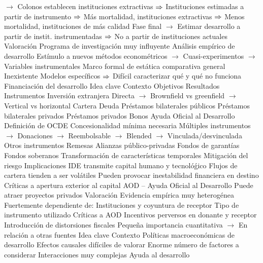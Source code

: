 \documentclass{nuevotema}
\begin{document}
\begin{esquemal}
				\4[] $\to$ Colonos establecen instituciones extractivas
				\4[] $\Rightarrow$ Instituciones estimadas a partir de instrumento
				\4[] $\Rightarrow$ Más mortalidad, instituciones extractivas
				\4[] $\Rightarrow$ Menos mortalidad, instituciones de más calidad
				\4[] Fase final
				\4[] $\to$ Estimar desarrollo a partir de instit. instrumentadas
				\4[] $\Rightarrow$ No a partir de instituciones actuales
			\3 Valoración
				\4 Programa de investigación muy influyente
				\4[] Análisis empírico de desarrollo
				\4[] Estímulo a nuevos métodos econométricos
				\4[] $\to$ Cuasi-experimentos
				\4[] $\to$ Variables instrumentales
				\4 Marco formal de estática comparativa general
				\4[] Inexistente
				\4[] Modelos específicos
				\4[] $\Rightarrow$ Difícil caracterizar qué y qué no funciona
		\2 Financiación del desarrollo
			\3 Idea clave
				\4 Contexto
				\4 Objetivos
				\4 Resultados
			\3 Instrumentos
				\4 Inversión extranjera
				\4[] Directa
				\4[] $\to$ Brownfield vs greenfield
				\4[] $\to$ Vertical vs horizontal
				\4[] Cartera
				\4 Deuda
				\4[] Préstamos bilaterales públicos
				\4[] Préstamos bilaterales privados
				\4[] Préstamos privados
				\4[] Bonos
				\4 Ayuda Oficial al Desarrollo
				\4[] Definición de OCDE
				\4[] Concesionalidad mínima necesaria
				\4[] Múltiples instrumentos
				\4[] $\to$ Donaciones
				\4[] $\to$ Reembolsable
				\4[] $\to$ Blended
				\4[] $\to$ Vinculada/desvinculada
				\4 Otros instrumentos
				\4[] Remesas
				\4[] Alianzas público-privadas
				\4[] Fondos de garantías
				\4[] Fondos soberanos
				\4[] Transformación de características temporales
				\4[] Mitigación del riesgo
			\3 Implicaciones
				\4 IDE transmite capital humano y tecnolóǵico
				\4 Flujos de cartera tienden a ser volátiles
				\4[] Pueden provocar inestabilidad financiera en destino
				\4[] Críticas a apertura exterior al capital
				\4 AOD -- Ayuda Oficial al Desarrollo
				\4[] Puede atraer proyectos privados
			\3 Valoración
				\4 Evidencia empírica muy heterogénea
				\4 Fuertemente dependiente de:
				\4[] Instituciones y coyuntura de receptor
				\4[] Tipo de instrumento utilizado
				\4 Críticas a AOD
				\4[] Incentivos perversos en donante y receptor
				\4[] Introducción de distorsiones fiscales
				\4[] Pequeña importancia cuantitativa
				\4[] $\to$ En relación a otras fuentes
	\1 
		\2 Idea clave
			\3 Contexto
				\4 Políticas macroeconómicas de desarrollo
				\4[] Efectos causales difíciles de valorar
				\4[] Enorme número de factores a considerar
				\4[] Interacciones muy complejas
				\4 Ayuda al desarrollo

\end{esquemal}
\end{document}
